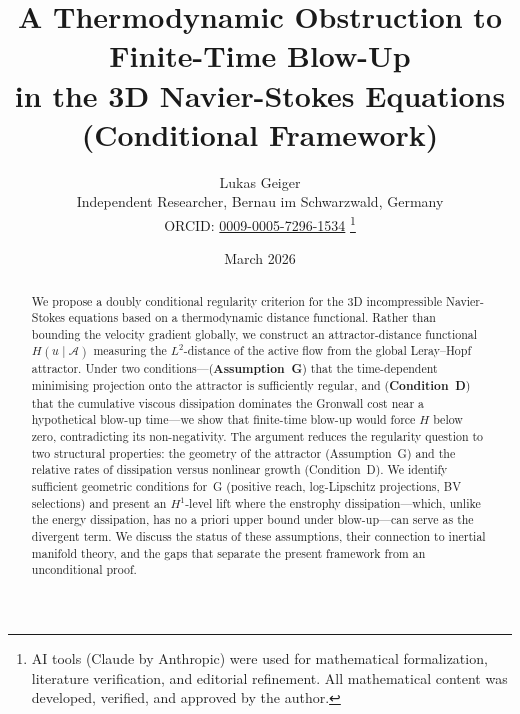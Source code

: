 \documentclass[12pt,a4paper]{article}
\title{\textbf{A Thermodynamic Obstruction to Finite-Time Blow-Up\\ in the 3D Navier-Stokes Equations (Conditional Framework)}}
\author{Lukas Geiger\\
\small Independent Researcher, Bernau im Schwarzwald, Germany\\
\small ORCID: \href{https://orcid.org/0009-0005-7296-1534}{0009-0005-7296-1534}%
\thanks{AI tools (Claude by Anthropic) were used for mathematical formalization, literature verification, and editorial refinement. All mathematical content was developed, verified, and approved by the author.}}
\date{March 2026}
\theoremstyle{definition}
\theoremstyle{plain}
\theoremstyle{remark}
\begin{document}
\maketitle

\begin{abstract}
We propose a doubly conditional regularity criterion for the 3D incompressible Navier-Stokes equations based on a thermodynamic distance functional. Rather than bounding the velocity gradient globally, we construct an attractor-distance functional $H(u \mid \mathcal{A})$ measuring the $L^2$-distance of the active flow from the global Leray--Hopf attractor. Under two conditions---(\textbf{Assumption~G}) that the time-dependent minimising projection onto the attractor is sufficiently regular, and (\textbf{Condition~D}) that the cumulative viscous dissipation dominates the Gronwall cost near a hypothetical blow-up time---we show that finite-time blow-up would force $H$ below zero, contradicting its non-negativity. The argument reduces the regularity question to two structural properties: the geometry of the attractor (Assumption~G) and the relative rates of dissipation versus nonlinear growth (Condition~D). We identify sufficient geometric conditions for~G (positive reach, log-Lipschitz projections, BV selections) and present an $H^1$-level lift where the enstrophy dissipation---which, unlike the energy dissipation, has no a priori upper bound under blow-up---can serve as the divergent term. We discuss the status of these assumptions, their connection to inertial manifold theory, and the gaps that separate the present framework from an unconditional proof.
\end{abstract}
\end{document}
